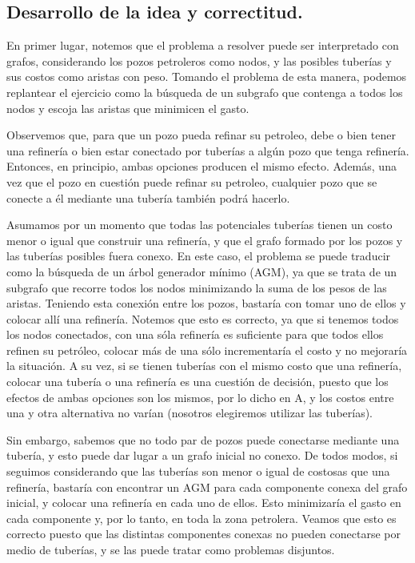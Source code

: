 \vspace*{0.6cm}

\subsection{Desarrollo de la idea y correctitud.}

\vspace*{0.3cm}

En primer lugar, notemos que el problema a resolver puede ser interpretado con grafos, considerando los pozos petroleros como nodos, y las posibles tuberías y sus costos como aristas con peso.  Tomando el problema de esta manera, podemos replantear el ejercicio como la búsqueda de un subgrafo que contenga a todos los nodos y escoja las aristas que minimicen el gasto.

Observemos que, para que un pozo pueda refinar su petroleo, debe o bien tener una refinería o bien estar conectado por tuberías a algún pozo que tenga refinería. Entonces, en principio, ambas opciones producen el mismo efecto. Además, una vez que el pozo en cuestión puede refinar su petroleo, cualquier pozo que se conecte a él mediante una tubería también podrá hacerlo.

Asumamos por un momento que todas las potenciales tuberías tienen un costo menor o igual que construir una refinería, y que el grafo formado por los pozos y las tuberías posibles fuera conexo.  En este caso, el problema se puede traducir como la búsqueda de un árbol generador mínimo (AGM), ya que se trata de un subgrafo que recorre todos los nodos minimizando la suma de los pesos de las aristas.  Teniendo esta conexión entre los pozos, bastaría con tomar uno de ellos y colocar allí una refinería. Notemos que esto es correcto, ya que si tenemos todos los nodos conectados, con una sóla refinería es suficiente para que todos ellos refinen su petróleo, colocar más de una sólo incrementaría el costo y no mejoraría la situación.  A su vez, si se tienen tuberías con el mismo costo que una refinería, colocar una tubería o una refinería es una cuestión de decisión, puesto que los efectos de ambas opciones son los mismos, por lo dicho en A, y los costos entre una y otra alternativa no varían (nosotros elegiremos utilizar las tuberías).

Sin embargo, sabemos que no todo par de pozos puede conectarse mediante una tubería, y esto puede dar lugar a un grafo inicial no conexo.  De todos modos, si seguimos considerando que las tuberías son menor o igual de costosas que una refinería, bastaría con encontrar un AGM para cada componente conexa del grafo inicial, y colocar una refinería en cada uno de ellos. Esto minimizaría el gasto en cada componente y, por lo tanto, en toda la zona petrolera. Veamos que esto es correcto puesto que las distintas componentes conexas no pueden conectarse por medio de tuberías, y se las puede tratar como problemas disjuntos.

